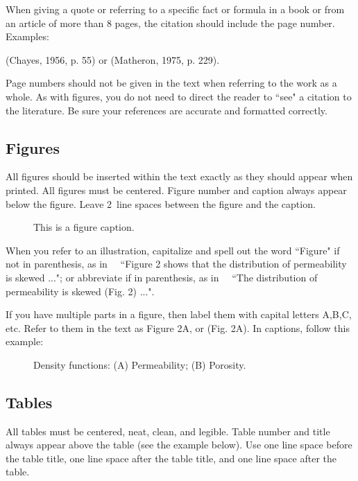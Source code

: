 \documentclass [10pt]{article}
\begin{document}
When giving a quote or referring to a specific fact or formula in
a book or from an article of more than 8 pages, the citation
should include the page number. Examples:

\begin{center}
(Chayes, 1956, p. 55) or (Matheron, 1975, p. 229).
\end{center}

Page numbers should not be given in the text when referring to the
work as a whole. As with figures, you do not need to direct the
reader to ``see" a citation to the literature. Be sure your
references are accurate and formatted correctly.

\subsection{Figures}
\vskip-0.25cm
All figures should be inserted within the text
exactly as they should appear when printed. All figures must be
centered. Figure number and caption always appear below the
figure. Leave 2~line spaces between the figure and the caption.

\begin{figure}[ht]
\vspace{3mm} \caption{This is a figure caption.}
\end{figure}

When you refer to an illustration, capitalize and spell out the
word ``Figure" if not in parenthesis, as in \ \ ``Figure 2 shows
that the distribution of permeability is skewed ..."; or
abbreviate if in parenthesis, as in \ \  ``The distribution of
permeability is skewed (Fig. 2) ...".

If you have multiple parts in a figure, then label them with
capital letters A,B,C, etc. Refer to them in the text as Figure
2A, or (Fig. 2A). In captions, follow this example:


\begin{figure}[ht]
\vspace{3mm} \caption{Density functions: (A) Permeability; (B)
Porosity.}
\end{figure}


\subsection{Tables}
\vskip-0.25cm
All tables must be centered, neat, clean, and
legible. Table number and title always appear above the table (see
the example below). Use one line space before the table title, one
line space after the table title, and one line space after the
table.
\end{document}
